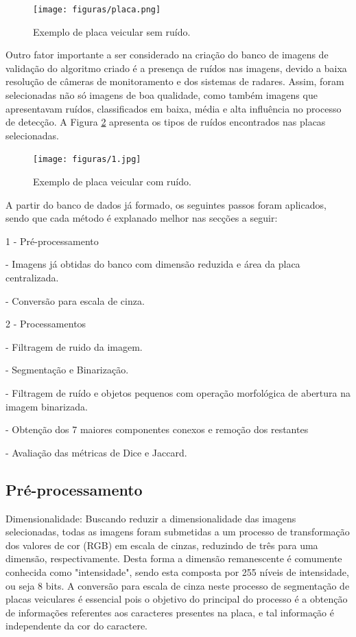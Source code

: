 \documentclass[
	12pt,				%
    oneside,			%
	a4paper,			%
	english,			%
	french,				%
	spanish,			%
	brazil,				%
	]{abntex2}
\begin{document}
\begin{figure}[!ht]
    \centering
    \texttt{[image: figuras/placa.png]}
    \caption{Exemplo de placa veicular sem ruído.}
    \label{fig:exemplo_placa}
\end{figure}

Outro fator importante a ser considerado na criação do banco de imagens de validação do algoritmo criado é a presença de ruídos nas imagens, devido a baixa resolução de câmeras de monitoramento e dos sistemas de radares. Assim, foram selecionadas não só imagens de boa qualidade, como também imagens que apresentavam ruídos, classificados em baixa, média e alta influência no processo de detecção. A Figura \ref{fig:placa_ruido} apresenta os tipos de ruídos encontrados nas placas selecionadas.

\begin{figure}[!ht]
    \centering
    \texttt{[image: figuras/1.jpg]}
    \caption{Exemplo de placa veicular com ruído.}
    \label{fig:placa_ruido}
\end{figure}


A partir do banco de dados já formado, os seguintes passos foram aplicados, sendo que cada método é explanado melhor nas secções a seguir:

1 - Pré-processamento 

    - Imagens já obtidas do banco com dimensão reduzida e área da placa centralizada.
    
    - Conversão para escala de cinza.
    
2 - Processamentos 

    - Filtragem de ruido da imagem.
    
    - Segmentação e Binarização.
    
    - Filtragem de ruído e objetos pequenos com operação morfológica de abertura na imagem binarizada.
    
    - Obtenção dos 7 maiores componentes conexos e remoção dos restantes
    
    - Avaliação das métricas de Dice e Jaccard. 
    
    

\subsection{Pré-processamento}

Dimensionalidade:
Buscando reduzir a dimensionalidade das imagens selecionadas, todas as imagens foram submetidas a um processo de transformação dos valores de cor (RGB) em escala de cinzas, reduzindo de três para uma dimensão, respectivamente. Desta forma a dimensão remanescente é comumente conhecida como "intensidade", sendo esta composta por 255 níveis de intensidade, ou seja 8 bits. A conversão para escala de cinza neste processo de segmentação de placas veiculares é essencial pois o objetivo do principal do processo é a obtenção de informações referentes aos caracteres presentes na placa, e tal informação é independente da cor do caractere. 
\end{document}
